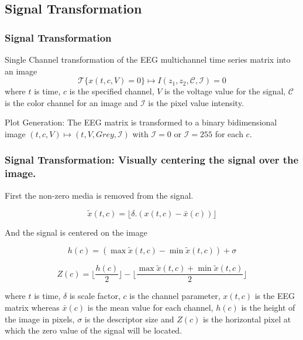 \documentclass[11pt]{beamer}
\begin{document}
    \subsection{Signal Transformation}
    \begin{frame}
        \frametitle{Signal Transformation}
        \begin{center}           

Single Channel transformation of the EEG multichannel time series matrix into an image
\begin{equation}
\mathscr{T}\{x(t,c,V)=0\} \mapsto I(z_1,z_2, \mathcal{C}, \mathcal{I}) = 0
\end{equation}
where $ t $ is time, $ c $ is the specified channel, $ V $ is the voltage value for the signal, $ \mathcal{C} $ is the color channel for an image and  $ \mathcal{I} $ is the pixel value intensity.

\vspace{17pt}

Plot Generation: The EEG matrix is transformed to a binary bidimensional image $ (t,c,V) \mapsto (t, V, Grey, \mathcal{I}) $ with $\mathcal{I} = 0$ or  $\mathcal{I} = 255$ for each $ c $.

		\end{center}
	\end{frame}
	
	\begin{frame}
	\frametitle{Signal Transformation: Visually centering the signal over the image.}
	\begin{center}

First the non-zero media is removed from the signal.
	
\begin{equation}
\tilde{x}(t,c) = \lfloor  \delta .(  x(t,c) - \bar{x}(c)  )   \rfloor 
\end{equation}
	
And the signal is centered on the image

\begin{equation}
h(c) = ( \max{} \tilde{x}(t,c) - \min{} \tilde{x}(t,c) ) + \sigma 
\end{equation}

\begin{equation}
Z(c) = \lfloor \frac{h(c)}{2} \rfloor - \lfloor \frac{\max{} \tilde{x}(t,c) + \min{} \tilde{x}(t,c)}{2} \rfloor 
\end{equation}

where $ t $ is time, $ \delta $ is scale factor,  $ c $ is the channel parameter, $ x(t,c) $ is the EEG matrix whereas $ \bar{x}(c) $ is the mean value for each channel,  $ h(c) $ is the height of the image in pixels, $ \sigma $ is the descriptor size and $ Z(c) $ is the horizontal pixel at which the zero value of the signal will be located.

	\end{center}
	\end{frame}
\end{document}
